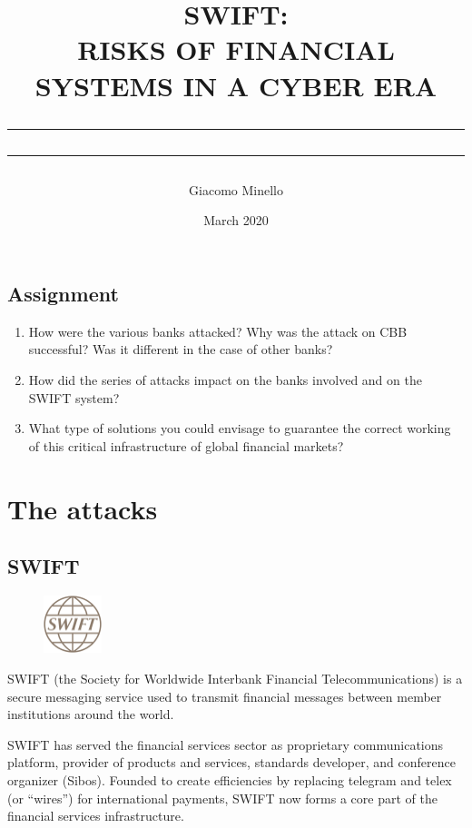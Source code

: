 \documentclass[12pt]{article}
\title{SWIFT: \\
RISKS OF FINANCIAL SYSTEMS IN A CYBER ERA\\
\textcolor{red}{\rule[0.1cm]{13cm}{0.1mm}}
\rule[0.5cm]{13.5cm}{0.6mm}}
\author{Giacomo Minello}
\date{March 2020}
\begin{document}
\begin{titlepage}
\maketitle
\section*{Assignment}
\begin{enumerate}
    \item How were the various banks attacked? Why was the attack on CBB successful? Was it different in the case of other banks?
    \item How did the series of attacks impact on the banks involved and on the SWIFT system?
    \item What type of solutions you could envisage to guarantee the correct working of this critical infrastructure of global financial markets?
\end{enumerate}

\end{titlepage}

\tableofcontents



\newpage

\listoffigures
\listoftables

\newpage
{}
\section{The attacks}
    \subsection{SWIFT}
    \begin{figure}
    \centering
    \includegraphics[width=0.15\textwidth]{figures/swiftlogo.png}
    \end{figure}
        
        SWIFT (the Society for Worldwide Interbank Financial Telecommunications) is a secure messaging service used to transmit financial messages between member institutions around the world. 
        
        SWIFT has served the financial services sector as proprietary communications platform, provider of products and services, standards developer, and conference organizer (Sibos). Founded to create efficiencies by replacing telegram and telex (or “wires”) for international payments, SWIFT now forms a core part of the financial services infrastructure.
    
\end{document}
